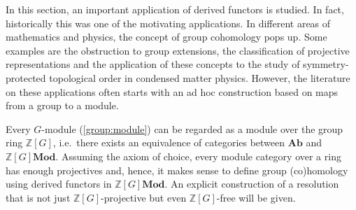 	In this section, an important application of derived functors is studied. In fact, historically this was one of the motivating applications. In different areas of mathematics and physics, the concept of group cohomology pops up. Some examples are the obstruction to group extensions, the classification of projective representations and the application of these concepts to the study of symmetry-protected topological order in condensed matter physics. However, the literature on these applications often starts with an ad hoc construction based on maps from a group to a module.

    Every $G$-module (\cref{group:module}) can be regarded as a module over the group ring $\mathbb{Z}[G]$, i.e.~there exists an equivalence of categories between $\mathbf{Ab}$ and $\mathbb{Z}[G]\mathbf{Mod}$. Assuming the axiom of choice, every module category over a ring has enough projectives and, hence, it makes sense to define group (co)homology using derived functors in $\mathbb{Z}[G]\mathbf{Mod}$. An explicit construction of a resolution that is not just $\mathbb{Z}[G]$-projective but even $\mathbb{Z}[G]$-free will be given.

